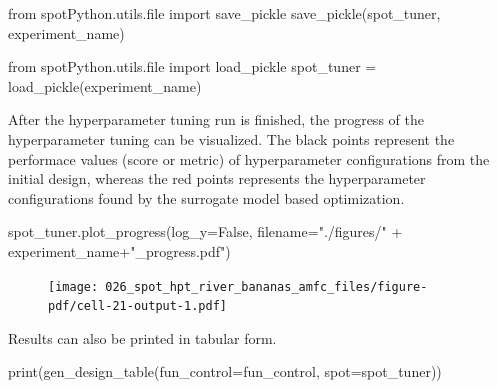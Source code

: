 \documentclass[
  letterpaper,
  DIV=11,
  numbers=noendperiod]{scrreprt}
\newenvironment{Shaded}{\begin{snugshade}}{\end{snugshade}}
\newcommand{\BuiltInTok}[1]{\textcolor[rgb]{0.00,0.23,0.31}{#1}}
\newcommand{\ImportTok}[1]{\textcolor[rgb]{0.00,0.46,0.62}{#1}}
\newcommand{\NormalTok}[1]{\textcolor[rgb]{0.00,0.23,0.31}{#1}}
\newcommand{\OperatorTok}[1]{\textcolor[rgb]{0.37,0.37,0.37}{#1}}
\newcommand{\StringTok}[1]{\textcolor[rgb]{0.13,0.47,0.30}{#1}}
\newcommand{\VariableTok}[1]{\textcolor[rgb]{0.07,0.07,0.07}{#1}}
\begin{document}
\begin{Shaded}
\begin{Highlighting}[]
\ImportTok{from}\NormalTok{ spotPython.utils.}\BuiltInTok{file} \ImportTok{import}\NormalTok{ save\_pickle}
\NormalTok{save\_pickle(spot\_tuner, experiment\_name)}
\end{Highlighting}
\end{Shaded}

\begin{Shaded}
\begin{Highlighting}[]
\ImportTok{from}\NormalTok{ spotPython.utils.}\BuiltInTok{file} \ImportTok{import}\NormalTok{ load\_pickle}
\NormalTok{spot\_tuner }\OperatorTok{=}\NormalTok{ load\_pickle(experiment\_name)}
\end{Highlighting}
\end{Shaded}

After the hyperparameter tuning run is finished, the progress of the
hyperparameter tuning can be visualized. The black points represent the
performace values (score or metric) of hyperparameter configurations
from the initial design, whereas the red points represents the
hyperparameter configurations found by the surrogate model based
optimization.

\begin{Shaded}
\begin{Highlighting}[]
\NormalTok{spot\_tuner.plot\_progress(log\_y}\OperatorTok{=}\VariableTok{False}\NormalTok{, filename}\OperatorTok{=}\StringTok{"./figures/"} \OperatorTok{+}\NormalTok{ experiment\_name}\OperatorTok{+}\StringTok{"\_progress.pdf"}\NormalTok{)}
\end{Highlighting}
\end{Shaded}

\begin{figure}[H]

{\centering \texttt{[image: 026\_spot\_hpt\_river\_bananas\_amfc\_files/figure-pdf/cell-21-output-1.pdf]}

}

\end{figure}

Results can also be printed in tabular form.

\begin{Shaded}
\begin{Highlighting}[]
\BuiltInTok{print}\NormalTok{(gen\_design\_table(fun\_control}\OperatorTok{=}\NormalTok{fun\_control, spot}\OperatorTok{=}\NormalTok{spot\_tuner))}
\end{Highlighting}
\end{Shaded}
\end{document}
